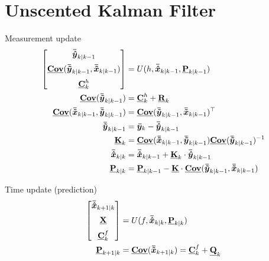 
\section{Unscented Kalman Filter} %
\label{sec:unscented_kalman_filter}
Measurement update 
\begin{equation}
        \begin{split}
                \begin{bmatrix}
                \bm{\bar{\hat{y}}}_{k \vert k-1} \\[2mm]
                \mathbf{\underline{{Cov}}}(\bm{\bar{\tilde{y}}}_{k \vert k-1}, \bm{\bar{\tilde{x}}}_{k \vert k-1}) \\[2mm]
                \mathbf{\underline{{C}}}_{k}^{h}
                \end{bmatrix} &= U(h, \bm{\bar{\hat{x}}}_{k \vert k-1}, \mathbf{\underline{{P}}}_{k \vert k -1}) \\
                \mathbf{\underline{{Cov}}}(\bm{\bar{\tilde{y}}}_{k \vert k-1}) &= \mathbf{\underline{{C}}}_{k}^{h} + \mathbf{\underline{{R}}}_k \\
                \mathbf{\underline{{Cov}}}(\bm{\bar{\tilde{x}}}_{k \vert k-1},\bm{\bar{\tilde{y}}}_{k \vert k-1}) &= \mathbf{\underline{{Cov}}}(\bm{\bar{\tilde{y}}}_{k \vert k-1},\bm{\bar{\tilde{x}}}_{k \vert k-1})^\top \\
                \bm{\bar{\tilde{y}}}_{k \vert k-1} &= \bm{\bar{y}}_k - \bm{\bar{\hat{y}}}_{k \vert k-1} \\
                \mathbf{\underline{{K}}}_k &= \mathbf{\underline{{Cov}}}(\bm{\bar{\tilde{x}}}_{k \vert k-1},\bm{\bar{\tilde{y}}}_{k \vert k-1})\mathbf{\underline{{Cov}}}(\bm{\bar{\tilde{y}}}_{k \vert k-1})^{-1} \\
                \bm{\bar{\hat{x}}}_{k \vert k} &= \bm{\bar{\hat{x}}}_{k \vert k-1} + \mathbf{\underline{{K}}}_k \cdot \bm{\bar{\hat{y}}}_{k \vert k-1} \\
                \mathbf{\underline{{P}}}_{k \vert k} &= \mathbf{\underline{{P}}}_{k \vert k-1} - \mathbf{\underline{{K}}} \cdot \mathbf{\underline{{Cov}}}(\bm{\bar{\tilde{y}}}_{k \vert k-1},\bm{\bar{\tilde{x}}}_{k \vert k-1})
        \end{split}
\end{equation}

Time update (prediction)
\begin{equation}
        \begin{split}
                \begin{bmatrix}
                \bm{\bar{\hat{x}}}_{k+1 \vert k} \\[2mm]
                \mathbf{\underline{{X}}} \\[2mm]
                \mathbf{\underline{{C}}}_{k}^{f}
                \end{bmatrix} &= U(f,\bm{\bar{\hat{x}}}_{k \vert k}, \mathbf{\underline{{P}}}_{k \vert k}) \\
                \mathbf{\underline{{P}}}_{k + 1 \vert k} &= \mathbf{\underline{{Cov}}}(\bm{\bar{\tilde{x}}}_{k+1 \vert k}) = \mathbf{\underline{{C}}}_{k}^{f} + \mathbf{\underline{{Q}}}_k
        \end{split}
\end{equation}

